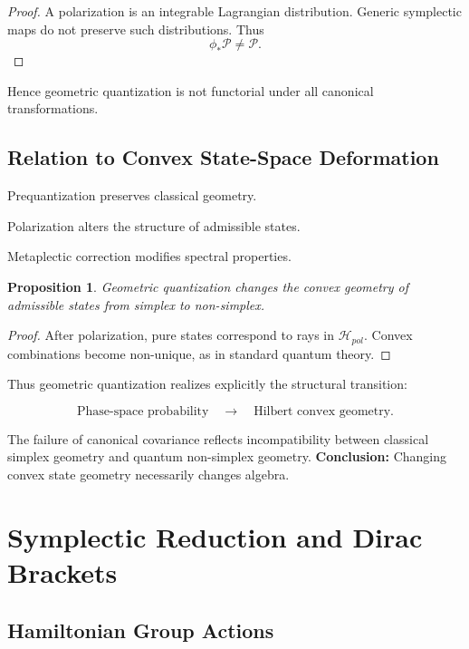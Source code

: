 \documentclass[11pt]{book}
\newtheorem{proposition}[theorem]{Proposition}
\begin{document}
\begin{proof}
A polarization is an integrable Lagrangian distribution.
Generic symplectic maps do not preserve such distributions.
Thus
\[
\phi_* \mathcal{P} \neq \mathcal{P}.
\]
\end{proof}

Hence geometric quantization
is not functorial under all canonical transformations.

\section{Relation to Convex State-Space Deformation}

Prequantization preserves classical geometry.

Polarization alters the structure of admissible states.

Metaplectic correction modifies spectral properties.

\begin{proposition}
Geometric quantization changes the convex geometry
of admissible states from simplex to non-simplex.
\end{proposition}

\begin{proof}
After polarization, pure states correspond to rays
in $\mathcal{H}_{pol}$.
Convex combinations become non-unique,
as in standard quantum theory.
\end{proof}

Thus geometric quantization realizes explicitly
the structural transition:

\[
\text{Phase-space probability}
\quad \longrightarrow \quad
\text{Hilbert convex geometry}.
\]

The failure of canonical covariance
reflects incompatibility between
classical simplex geometry
and quantum non-simplex geometry.
\textbf{Conclusion:}
Changing convex state geometry necessarily changes algebra.%
\chapter{Symplectic Reduction and Dirac Brackets}

\section{Hamiltonian Group Actions}
\end{document}
